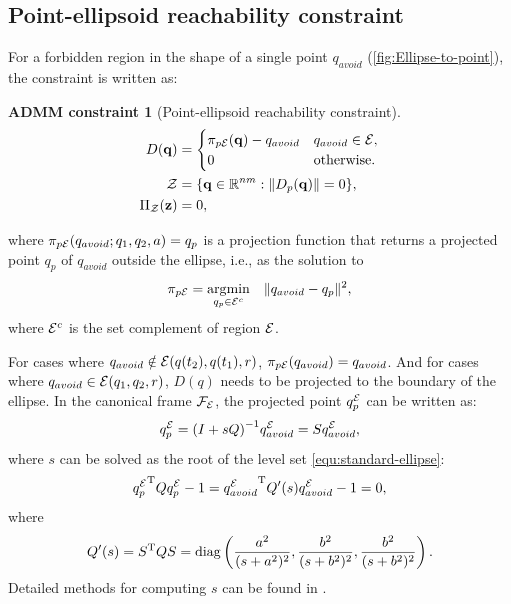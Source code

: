 \documentclass[10pt,twocolumn,twoside]{IEEEtran}
\newtheorem{constraint}{ADMM constraint}
\newcommand{\news}{\color{blue}}
\def\sZ{\mathcal{Z}}
\begin{document}
\subsection{Point-ellipsoid reachability constraint}\label{sec:ellipsoid-point}
{\news For a forbidden region in the shape of a single point $q_{avoid}$ (\cref{fig:Ellipse-to-point}), the constraint is written as:}
\begin{constraint}[Point-ellipsoid reachability constraint]
\begin{align}
D(\vq) &=  \begin{cases}
      \pi_{p\cE}(\vq) - q_{avoid} & q_{avoid} \in \cE, \\
      {0} & \textrm{otherwise}.
    \end{cases} \label{eq:point_ellipsoid_constraint}\\
  \sZ &= \{\vq\in\mathbb{R}^{nm}:\norm{D_p(\vq)} = 0 \},\\
   \Pi_\sZ(\vz) & = 0, 
\end{align}
\end{constraint}

where $\pi_{p\mathcal{E}}(q_{avoid};q_1,q_2,a) = q_p$ is a projection function that returns a projected point $q_p$ of $q_{avoid}$ outside the ellipse, i.e., as the solution to
\begin{equation}\label{eq:ellipse-point-projection}
\pi_{p\mathcal{E}}=\operatorname*{\arg\!\min}_{q_p\in\mathcal{E}^c} \quad \lVert q_{avoid}-q_p\rVert^2,
\end{equation}
where $\mathcal{E}^{c}$ is the set complement of region $\mathcal{E}$.

For cases where $q_{avoid} \notin \mathcal{E}(q(t_2),q(t_1),r)$, $\pi_{p\mathcal{E}}(q_{avoid}) = q_{avoid}$. And for cases where $q_{avoid} \in \mathcal{E}(q_1,q_2,r)$, $D(q)$ needs to be projected to the boundary of the ellipse. 
In the canonical frame $\mathcal{F}_{\mathcal{E}}$, the projected point $q^{\mathcal{E}}_{p}$ can be written as:
  \begin{equation}
  	q^{\mathcal{E}}_{p} = {(I+sQ)}^{-1} q^{\mathcal{E}}_{avoid} = S q^{\mathcal{E}}_{avoid},
  \end{equation}
where $s$ can be solved as the root of the level set \eqref{equ:standard-ellipse}:
  \begin{equation}
    {q^{\mathcal{E}}_p}^\mathrm{T} Q q^{\mathcal{E}}_p-1={q^{\mathcal{E}}_{avoid}}^\mathrm{T} Q'(s) q^{\mathcal{E}}_{avoid} -1=0,
  \end{equation}
  where
  \begin{equation}
    Q'(s) =S^\mathrm{T} Q S = \operatorname{diag}\left(\frac{a^{2}}{(s+a^{2})^2}, \frac{b^{2}}{(s+b^{2})^2},\frac{b^{2}}{(s+b^{2})^2}\right).
  \end{equation}
 Detailed methods for computing $s$ can be found in \cite{yang2021multi,yang2020multi,eberly}. 
\end{document}
